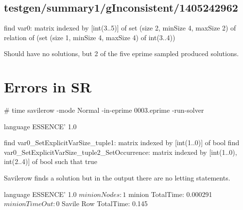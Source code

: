 \subsection{testgen/summary1/gInconsistent/1405242962}

\begin{lst:essence}
find var0:
	matrix indexed by [int(3..5)] of set (size 2, minSize 4, maxSize 2) of
		relation of (set (size 1, minSize 4, maxSize 4) of int(3..4))
\end{lst:essence}

Should have no solutions, but 2 of the five eprime sampled produced solutions.
\\
\section{Errors in SR}

\begin{lst:essence}
# time savilerow -mode Normal -in-eprime 0003.eprime -run-solver

language ESSENCE' 1.0

find var0_SetExplicitVarSize_tuple1: matrix indexed by [int(1..0)] of bool
find var0_SetExplicitVarSize_tuple2_SetOccurrence:
        matrix indexed by [int(1..0), int(2..4)] of bool
such that true
\end{lst:essence}

Savilerow finds a solution but in the output there are no letting statements.

\begin{lst:essence}[mathescape=False]
language ESSENCE' 1.0
$ minion Nodes: 1
$ minion TotalTime: 0.000291
$ minion TimeOut: 0
$ Savile Row TotalTime: 0.145
\end{lst:essence}





